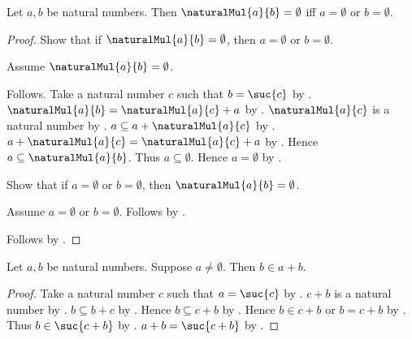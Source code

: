 \begin{proposition}\label{natural_multiplication_zero_iff}
    Let $a,b$ be natural numbers.
    Then $\naturalMul{a}{b}=\emptyset$ iff
        $a=\emptyset$ or $b=\emptyset$.
\end{proposition}
\begin{proof}
    Show that if $\naturalMul{a}{b}=\emptyset$, then
        $a=\emptyset$ or $b=\emptyset$.
    \begin{subproof}
        Assume $\naturalMul{a}{b}=\emptyset$.
        \begin{byCase}
                Follows.
                Take a natural number $c$ such that $b=\suc{c}$
                    by .
                $\naturalMul{a}{b}=\naturalMul{a}{c}+a$
                    by .
                $\naturalMul{a}{c}$ is a natural number
                    by .
                $a\subseteq a+\naturalMul{a}{c}$
                    by .
                $a+\naturalMul{a}{c}=\naturalMul{a}{c}+a$
                    by .
                Hence $a\subseteq\naturalMul{a}{b}$.
                Thus $a\subseteq\emptyset$.
                Hence $a=\emptyset$
                    by .
        \end{byCase}
    \end{subproof}
    Show that if $a=\emptyset$ or $b=\emptyset$, then
        $\naturalMul{a}{b}=\emptyset$.
    \begin{subproof}
        Assume $a=\emptyset$ or $b=\emptyset$.
        Follows by
            .
    \end{subproof}
    Follows by \auto.
\end{proof}

\begin{proposition}\label{positive_summand_makes_strict_sum}
    Let $a,b$ be natural numbers.
    Suppose $a\neq\emptyset$.
    Then $b\in a+b$.
\end{proposition}
\begin{proof}
    Take a natural number $c$ such that $a=\suc{c}$
        by .
    $c+b$ is a natural number by .
    $b\subseteq b+c$ by .
    Hence $b\subseteq c+b$ by .
    Hence $b\in c+b$ or $b=c+b$
        by .
    Thus $b\in\suc{c+b}$ by .
    $a+b=\suc{c+b}$ by .
\end{proof}

